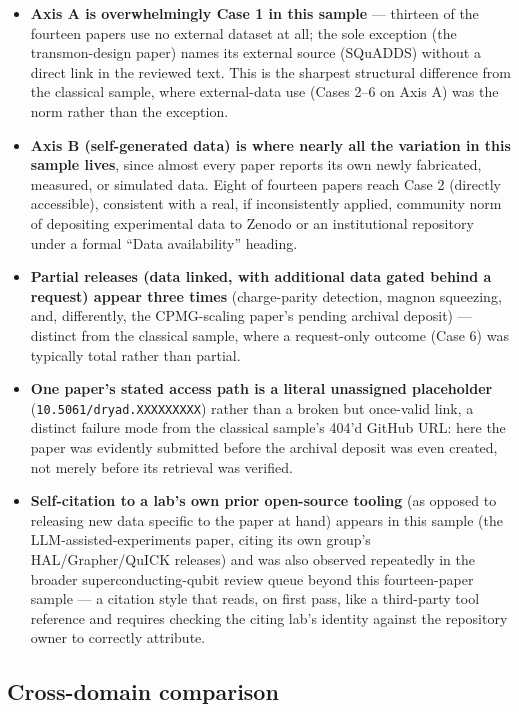 \begin{itemize}[leftmargin=1.5em]
    \item \textbf{Axis A is overwhelmingly Case 1 in this sample} --- thirteen of the
    fourteen papers use no external dataset at all; the sole exception (the
    transmon-design paper) names its external source (SQuADDS) without a direct link in
    the reviewed text. This is the sharpest structural difference from the classical
    sample, where external-data use (Cases 2--6 on Axis A) was the norm rather than the
    exception.
    \item \textbf{Axis B (self-generated data) is where nearly all the variation in this
    sample lives}, since almost every paper reports its own newly fabricated,
    measured, or simulated data. Eight of fourteen papers reach Case 2 (directly
    accessible), consistent with a real, if inconsistently applied, community norm of
    depositing experimental data to Zenodo or an institutional repository under a
    formal ``Data availability'' heading.
    \item \textbf{Partial releases (data linked, with additional data gated behind a
    request) appear three times} (charge-parity detection, magnon squeezing, and,
    differently, the CPMG-scaling paper's pending archival deposit) --- distinct from
    the classical sample, where a request-only outcome (Case 6) was typically total
    rather than partial.
    \item \textbf{One paper's stated access path is a literal unassigned placeholder}
    (\texttt{10.5061/dryad.XXXXXXXXX}) rather than a broken but once-valid link, a
    distinct failure mode from the classical sample's 404'd GitHub URL: here the paper
    was evidently submitted before the archival deposit was even created, not merely
    before its retrieval was verified.
    \item \textbf{Self-citation to a lab's own prior open-source tooling} (as opposed to
    releasing new data specific to the paper at hand) appears in this sample (the
    LLM-assisted-experiments paper, citing its own group's HAL/Grapher/QuICK releases)
    and was also observed repeatedly in the broader superconducting-qubit review queue
    beyond this fourteen-paper sample --- a citation style that reads, on first pass, like
    a third-party tool reference and requires checking the citing lab's identity against
    the repository owner to correctly attribute.
\end{itemize}

\subsection{Cross-domain comparison}

